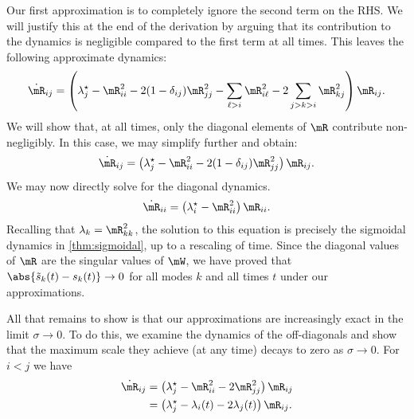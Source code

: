 Our first approximation is to completely ignore the second term on the RHS. We will justify this at the end of the derivation by arguing that its contribution to the dynamics is negligible compared to the first term at all times. This leaves the following approximate dynamics:
\begin{equation}
    \dot\mR_{ij} = \left(\lambda^\star_j - \mR_{ii}^2 - 2(1-\delta_{ij})\mR_{jj}^2 - \sum_{\ell> i} \mR_{i\ell}^2 - 2\sum_{j > k > i} \mR_{kj}^2 \right)\mR_{ij}.
\end{equation}
We will show that, at all times, only the diagonal elements of $\mR$ contribute non-negligibly. In this case, we may simplify further and obtain:
\begin{equation}
    \dot\mR_{ij} = \left(\lambda^\star_j - \mR_{ii}^2 - 2(1-\delta_{ij})\mR_{jj}^2 \right)\mR_{ij}.
\end{equation}
We may now directly solve for the diagonal dynamics.
\begin{equation}
    \dot\mR_{ii} = \left(\lambda^\star_i - \mR_{ii}^2  \right)\mR_{ii}.
\end{equation}
Recalling that  $\lambda_k=\mR_{kk}^2$, the solution to this equation is precisely the sigmoidal dynamics in \cref{thm:sigmoidal}, up to a rescaling of time. Since the diagonal values of $\mR$ are the singular values of $\mW$, we have proved that $\abs{\tilde s_k(t)-s_k(t)}\to0$ for all modes $k$ and all times $t$ under our approximations.

All that remains to show is that our approximations are increasingly exact in the limit $\sigma\to 0$. To do this, we examine the dynamics of the off-diagonals and show that the maximum scale they achieve (at any time) decays to zero as $\sigma\to 0$. For $i<j$ we have
\begin{align}
    \dot\mR_{ij} &= \left(\lambda^\star_j - \mR_{ii}^2 - 2\mR_{jj}^2 \right)\mR_{ij} \\
    &= \left(\lambda^\star_j - \lambda_i(t) - 2\lambda_j(t) \right)\mR_{ij}.
\end{align}

